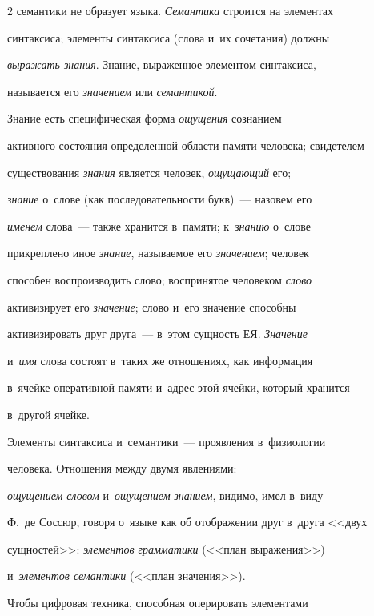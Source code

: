 \begin{multicols}{2}
семантики не образует языка. \textit{Семантика} строится на элементах 

синтаксиса; элементы синтаксиса (слова и~их сочетания) должны 

\textit{выражать знания}. Знание, выраженное элементом синтаксиса, 

называется его \textit{значением} или \textit{семантикой}. 

     

     Знание есть специфическая форма \textit{ощущения} сознанием 

активного состояния определенной об\-ласти памяти человека; свидетелем 

существования \textit{знания} является человек, \textit{ощущающий} его; 

\textit{знание} о~слове (как последовательности букв)~--- назовем его 

\textit{именем} слова~--- также хранится в~памяти; к~\textit{знанию} о~слове 

прикреплено иное \textit{знание}, называемое его \textit{значением}; человек 

способен воспроизводить слово; воспринятое человеком \textit{слово} 

активизирует его \textit{значение}; слово и~его значение способны 

активизировать друг друга~--- в~этом сущность ЕЯ. \textit{Значение} 

и~\textit{имя} слова состоят в~таких же отношениях, как информация 

в~ячейке оперативной памяти и~адрес этой ячейки, который хранится 

в~другой ячейке. 

     

     Элементы синтаксиса и~семантики~--- проявления в~физиологии 

человека. Отношения между двумя явлениями: 

\textit{ощущением}-\textit{словом} и~\textit{ощу\-ще\-ни\-ем}-\textit{зна\-ни\-ем}, видимо, имел в~виду 

Ф.~де Соссюр, говоря о~языке как об отображении друг в~друга <<двух 

сущностей>>: \textit{элементов грамматики} (<<план выражения>>) 

и~\textit{элементов семантики} (<<план значения>>).

     

     Чтобы цифровая техника, способная оперировать элементами 


\end{multicols}
